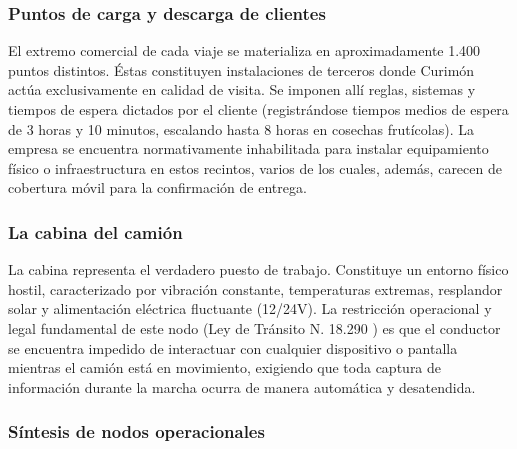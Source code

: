 \subsubsection{Puntos de carga y descarga de clientes}

El extremo comercial de cada viaje se materializa en aproximadamente 1.400 puntos distintos. Éstas constituyen instalaciones de terceros donde Curimón actúa exclusivamente en calidad de visita. Se imponen allí reglas, sistemas y tiempos de espera dictados por el cliente (registrándose tiempos medios de espera de 3 horas y 10 minutos, escalando hasta 8 horas en cosechas frutícolas). La empresa se encuentra normativamente inhabilitada para instalar equipamiento físico o infraestructura en estos recintos, varios de los cuales, además, carecen de cobertura móvil para la confirmación de entrega.

\subsubsection{La cabina del camión}

La cabina representa el verdadero puesto de trabajo. Constituye un entorno físico hostil, caracterizado por vibración constante, temperaturas extremas, resplandor solar y alimentación eléctrica fluctuante (12/24V). La restricción operacional y legal fundamental de este nodo (Ley de Tránsito N.\textordmasculine{} 18.290 \parencite{ley18290}) es que el conductor se encuentra impedido de interactuar con cualquier dispositivo o pantalla mientras el camión está en movimiento, exigiendo que toda captura de información durante la marcha ocurra de manera automática y desatendida.

\subsubsection{Síntesis de nodos operacionales}

